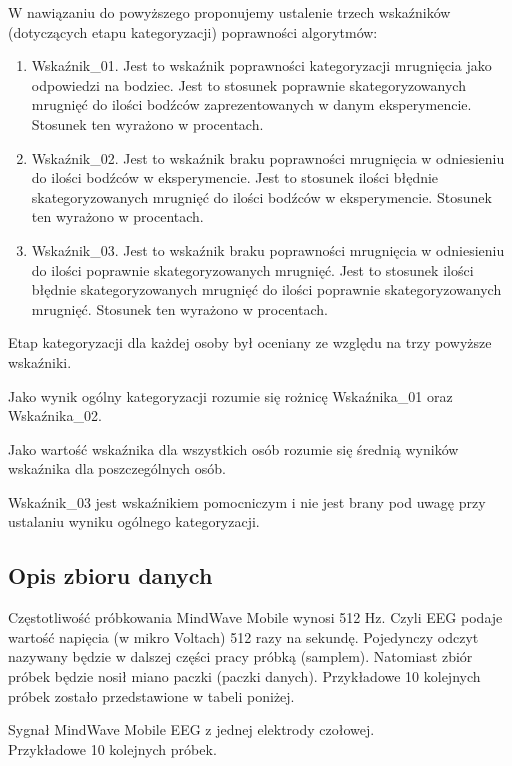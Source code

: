 \documentclass{article}
\begin{document}
    W nawiązaniu do powyższego proponujemy ustalenie trzech wskaźników (dotyczących etapu kategoryzacji) poprawności algorytmów:
    \begin{enumerate}
        \item Wskaźnik\_01. Jest to wskaźnik poprawności kategoryzacji mrugnięcia jako odpowiedzi na bodziec.
    Jest to stosunek poprawnie skategoryzowanych mrugnięć do ilości bodźców zaprezentowanych w danym eksperymencie.
    Stosunek ten wyrażono w procentach.
        \item Wskaźnik\_02. Jest to wskaźnik braku poprawności mrugnięcia w odniesieniu do ilości bodźców w eksperymencie.
    Jest to stosunek ilości błędnie skategoryzowanych mrugnięć do ilości bodźców w eksperymencie.
    Stosunek ten wyrażono w procentach.
        \item Wskaźnik\_03. Jest to wskaźnik braku poprawności mrugnięcia w odniesieniu do ilości poprawnie skategoryzowanych mrugnięć.
    Jest to stosunek ilości błędnie skategoryzowanych mrugnięć do ilości poprawnie skategoryzowanych mrugnięć. 
    Stosunek ten wyrażono w procentach.
    \end{enumerate}
    Etap kategoryzacji dla każdej osoby był oceniany ze względu na trzy powyższe wskaźniki. %
    \vspace{\baselineskip}

    Jako wynik ogólny kategoryzacji rozumie się rożnicę Wskaźnika\_01 oraz Wskaźnika\_02.
    \vspace{\baselineskip}

    Jako wartość wskaźnika dla wszystkich osób rozumie się średnią wyników wskaźnika dla poszczególnych osób.
    \vspace{\baselineskip}

    Wskaźnik\_03 jest wskaźnikiem pomocniczym i nie jest brany pod uwagę przy ustalaniu wyniku ogólnego kategoryzacji.

    \subsection{Opis zbioru danych}
    Częstotliwość próbkowania MindWave Mobile wynosi 512 Hz. Czyli EEG podaje wartość napięcia (w mikro Voltach) 512 razy na sekundę. Pojedynczy odczyt nazywany będzie w dalszej części pracy próbką (samplem). Natomiast zbiór próbek będzie nosił miano paczki (paczki danych).
    Przykładowe 10 kolejnych próbek zostało przedstawione w tabeli poniżej.
    \newline
    \begin{table}[h]
        \begin{center}
        \caption[Table caption text]{Sygnał MindWave Mobile EEG z jednej elektrody czołowej.\\ Przykładowe 10 kolejnych próbek.}
        \end{center}
    \end{table}
\end{document}
